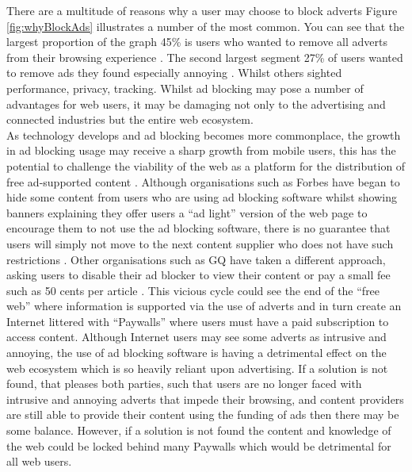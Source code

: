 \documentclass[12pt]{article}
\begin{document}
There are a multitude of reasons why a user may choose to block adverts Figure \ref{fig:whyBlockAds} illustrates a number of the most common. You can see that the largest proportion of the graph 45\% is users who wanted to remove all adverts from their browsing experience \parencite{publishersWeb}. The second largest segment 27\% of users wanted to remove ads they found especially annoying \parencite{publishersWeb}. Whilst others sighted performance, privacy, tracking. Whilst ad blocking may pose a number of advantages for web users, it may be damaging not only to the advertising and connected industries but the entire web ecosystem. \\

As technology develops and ad blocking becomes more commonplace, the growth in ad blocking usage may receive a sharp growth from mobile users,  this has the potential to challenge the viability of the web as a platform for the distribution of free ad-supported content \parencite{adobeAdBlock}. Although organisations such as Forbes have began to hide some content from users who are using ad blocking software whilst showing banners explaining they offer users a ``ad light'' version of the web page to encourage them to not use the ad blocking software, there is no guarantee that users will simply not move to the next content supplier who does not have such restrictions \parencite{publishersWeb}. Other organisations such as GQ have taken a different approach, asking users to disable their ad blocker to view their content or pay a small fee such as 50 cents per article \parencite{gq}.  This vicious cycle could see the end of the ``free web'' where information is supported via the use of adverts and in turn create an Internet littered with ``Paywalls'' where users must have a paid subscription to access content. Although Internet users may see some adverts as intrusive and annoying, the use of ad blocking software is having a detrimental effect on the web ecosystem which is so heavily reliant upon advertising. If a solution is not found, that pleases both parties, such that users are no longer faced with intrusive and annoying adverts that impede their browsing, and content providers are still able to provide their content using the funding of ads then there may be some balance. However, if a solution is not found the content and knowledge of the web could be locked behind many Paywalls which would be detrimental for all web users. \\
\end{document}
